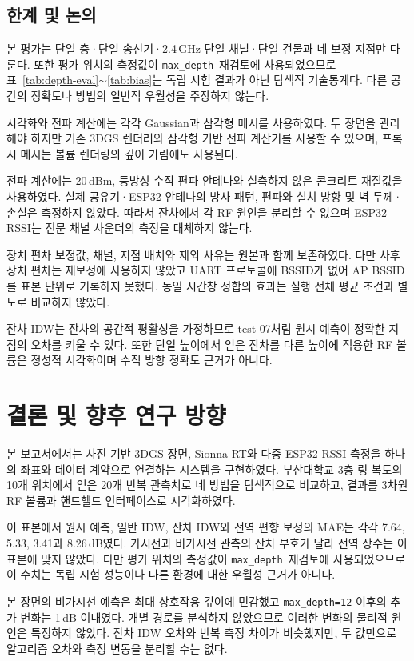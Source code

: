 \documentclass[11pt,a4paper]{article}
\newcommand{\md}{\texttt{max\_depth}}
\begin{document}
\subsection{한계 및 논의}

본 평가는 단일 층·단일 송신기·2.4\,GHz 단일 채널·단일 건물과 네 보정 지점만 다룬다. 또한 평가 위치의
측정값이 \md\ 재검토에 사용되었으므로 표~\ref{tab:depth-eval}$\sim$\ref{tab:bias}는 독립 시험
결과가 아닌 탐색적 기술통계다. 다른 공간의 정확도나 방법의 일반적 우월성을 주장하지 않는다.

시각화와 전파 계산에는 각각 Gaussian과 삼각형 메시를 사용하였다. 두 장면을 관리해야 하지만 기존 3DGS
렌더러와 삼각형 기반 전파 계산기를 사용할 수 있으며, 프록시 메시는 볼륨 렌더링의 깊이 가림에도 사용된다.

전파 계산에는 20\,dBm, 등방성 수직 편파 안테나와 실측하지 않은 콘크리트 재질값을 사용하였다. 실제
공유기·ESP32 안테나의 방사 패턴, 편파와 설치 방향 및 벽 두께·손실은 측정하지 않았다. 따라서 잔차에서 각
RF 원인을 분리할 수 없으며 ESP32 RSSI는 전문 채널 사운더의 측정을 대체하지 않는다.

장치 편차 보정값, 채널, 지점 배치와 제외 사유는 원본과 함께 보존하였다. 다만 사후 장치 편차는 재보정에
사용하지 않았고 UART 프로토콜에 BSSID가 없어 AP BSSID를 표본 단위로 기록하지 못했다. 동일 시간창 정합의
효과는 실행 전체 평균 조건과 별도로 비교하지 않았다.

잔차 IDW는 잔차의 공간적 평활성을 가정하므로 test-07처럼 원시 예측이 정확한 지점의 오차를 키울 수 있다.
또한 단일 높이에서 얻은 잔차를 다른 높이에 적용한 RF 볼륨은 정성적 시각화이며 수직 방향 정확도 근거가
아니다.

\section{결론 및 향후 연구 방향}

본 보고서에서는 사진 기반 3DGS 장면, Sionna RT와 다중 ESP32 RSSI 측정을 하나의 좌표와 데이터 계약으로
연결하는 시스템을 구현하였다. 부산대학교 3층 링 복도의 10개 위치에서 얻은 20개 반복 관측치로 네 방법을
탐색적으로 비교하고, 결과를 3차원 RF 볼륨과 핸드헬드 인터페이스로 시각화하였다.

이 표본에서 원시 예측, 일반 IDW, 잔차 IDW와 전역 편향 보정의 MAE는 각각 7.64, 5.33, 3.41과
8.26\,dB였다. 가시선과 비가시선 관측의 잔차 부호가 달라 전역 상수는 이 표본에 맞지 않았다. 다만 평가
위치의 측정값이 \md\ 재검토에 사용되었으므로 이 수치는 독립 시험 성능이나 다른 환경에 대한 우월성 근거가
아니다.

본 장면의 비가시선 예측은 최대 상호작용 깊이에 민감했고 \texttt{max\_depth=12} 이후의 추가 변화는
1\,dB 이내였다. 개별 경로를 분석하지 않았으므로 이러한 변화의 물리적 원인은 특정하지 않았다. 잔차 IDW
오차와 반복 측정 차이가 비슷했지만, 두 값만으로 알고리즘 오차와 측정 변동을 분리할 수는 없다.
\end{document}
